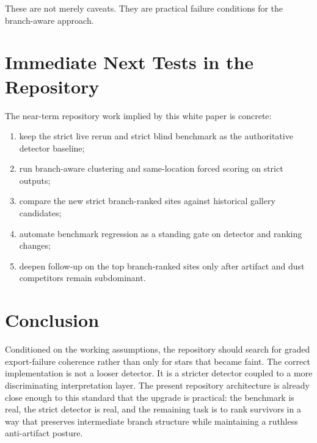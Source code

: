\documentclass[11pt]{article}
\begin{document}
These are not merely caveats. They are practical failure conditions for the branch-aware approach.

\section{Immediate Next Tests in the Repository}

The near-term repository work implied by this white paper is concrete:
\begin{enumerate}[leftmargin=1.5em]
\item keep the strict live rerun and strict blind benchmark as the authoritative detector baseline;
\item run branch-aware clustering and same-location forced scoring on strict outputs;
\item compare the new strict branch-ranked sites against historical gallery candidates;
\item automate benchmark regression as a standing gate on detector and ranking changes;
\item deepen follow-up on the top branch-ranked sites only after artifact and dust competitors remain subdominant.
\end{enumerate}

\section{Conclusion}

Conditioned on the working assumptions, the repository should search for graded export-failure coherence rather than only for stars that became faint. The correct implementation is not a looser detector. It is a stricter detector coupled to a more discriminating interpretation layer. The present repository architecture is already close enough to this standard that the upgrade is practical: the benchmark is real, the strict detector is real, and the remaining task is to rank survivors in a way that preserves intermediate branch structure while maintaining a ruthless anti-artifact posture.
\end{document}
